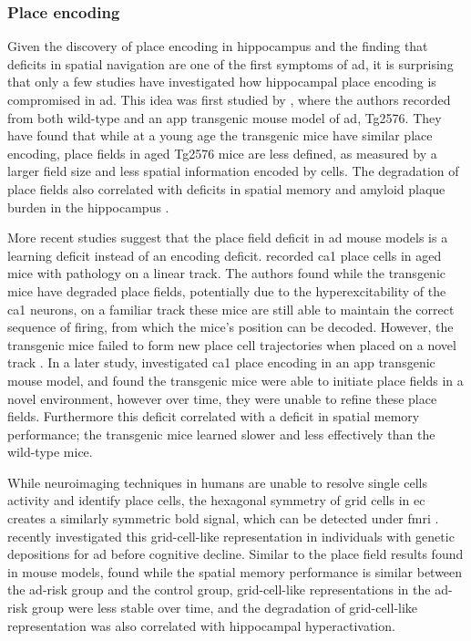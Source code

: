 \subsubsection{Place encoding}
Given the discovery of place encoding in hippocampus and the finding that deficits in spatial navigation are one of the first symptoms of \gls{ad}, it is surprising that only a few studies have investigated how hippocampal place encoding is compromised in \gls{ad}. This idea was first studied by \citet{cacucci08}, where the authors recorded from both wild-type and an \gls{app} transgenic mouse model of \gls{ad}, Tg2576. They have found that while at a young age the transgenic mice have similar place encoding, place fields in aged Tg2576 mice are less defined, as measured by a larger field size and less spatial information encoded by cells. The degradation of place fields also correlated with deficits in spatial memory and amyloid plaque burden in the hippocampus \citep{cacucci08}.

More recent studies suggest that the place field deficit in \gls{ad} mouse models is a learning deficit instead of an encoding deficit. \citet{cheng13} recorded \gls{ca1} place cells in aged mice with \atau{} pathology on a linear track. The authors found while the transgenic mice have degraded place fields, potentially due to the hyperexcitability of the \gls{ca1} neurons, on a familiar track these mice are still able to maintain the correct sequence of firing, from which the mice's position can be decoded. However, the transgenic mice failed to form new place cell trajectories when placed on a novel track \citep{cheng13}. In a later study, \citet{zhao14} investigated \gls{ca1} place encoding in an \gls{app} transgenic mouse model, and found the transgenic mice were able to initiate place fields in a novel environment, however over time, they were unable to refine these place fields. Furthermore this deficit correlated with a deficit in spatial memory performance; the transgenic mice learned slower and less effectively than the wild-type mice.

While neuroimaging techniques in humans are unable to resolve single cells activity and identify place cells, the hexagonal symmetry of grid cells in \gls{ec} creates a similarly symmetric \gls{bold} signal, which can be detected under \gls{fmri}  \citep{doeller10}. \citet{kunz15} recently investigated this grid-cell-like representation in individuals with genetic depositions for \gls{ad} before cognitive decline. Similar to the place field results found in mouse models, \citet{kunz15} found while the spatial memory performance is similar between the \gls{ad}-risk group and the control group, grid-cell-like representations in the \gls{ad}-risk group were less stable over time, and the degradation of grid-cell-like representation was also correlated with hippocampal hyperactivation. 


